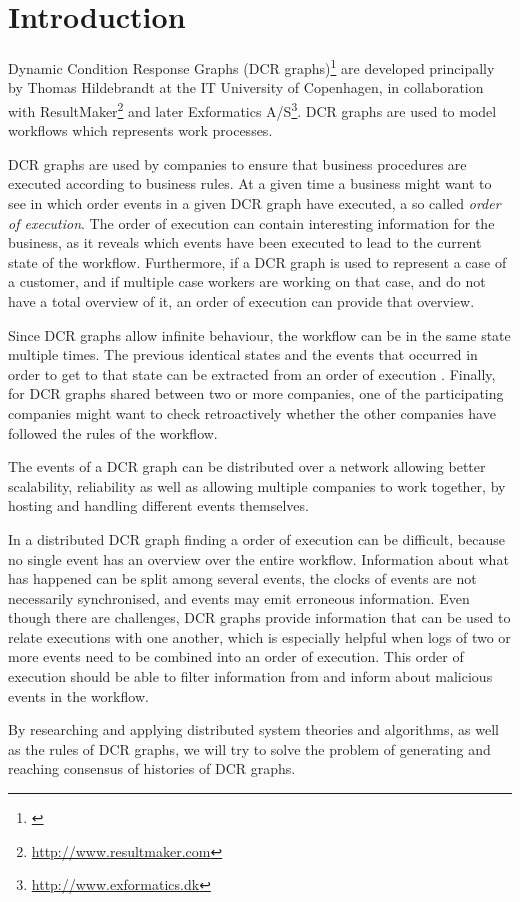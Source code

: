 \chapter{Introduction}
	Dynamic Condition Response Graphs (DCR graphs)\footnote{\cite{hildebrandt2011declarative}} are developed principally by Thomas Hildebrandt at the IT University of Copenhagen, in collaboration with ResultMaker\footnote{\url{http://www.resultmaker.com}} and later Exformatics A/S\footnote{\url{http://www.exformatics.dk}}. DCR graphs are used to model workflows which represents work processes.
	
	\newpar DCR graphs are used by companies to ensure that business procedures are executed according to business rules. At a given time a business might want to see in which order events in a given DCR graph have executed, a so called \textit{order of execution}. The order of execution can contain interesting information for the business, as it reveals which events have been executed to lead to the current state of the workflow. Furthermore, if a DCR graph is used to represent a case of a customer, and if multiple case workers are working on that case, and do not have a total overview of it, an order of execution can provide that overview. 
	
	Since DCR graphs allow infinite behaviour, the workflow can be in the same state multiple times. The previous identical states and the events that occurred in order to get to that state can be extracted from an order of execution . Finally, for DCR graphs shared between two or more companies, one of the participating companies might want to check retroactively whether the other companies have followed the rules of the workflow.
	
	\newpar The events of a DCR graph can be distributed over a network allowing better scalability, reliability as well as allowing multiple companies to work together, by hosting and handling different events themselves.
	
	\newpar In a distributed DCR graph finding a order of execution can be difficult, because no single event has an overview over the entire workflow. Information about what has happened can be split among several events, the clocks of events are not necessarily synchronised, and events may emit erroneous information. Even though there are challenges, DCR graphs provide information that can be used to relate executions with one another, which is especially helpful when logs of two or more events need to be combined into an order of execution. This order of execution should be able to filter information from and inform about malicious events in the workflow.

	
	\newpar By researching and applying distributed system theories and algorithms, as well as the rules of DCR graphs, we will try to solve the problem of generating and reaching consensus of histories of DCR graphs. 